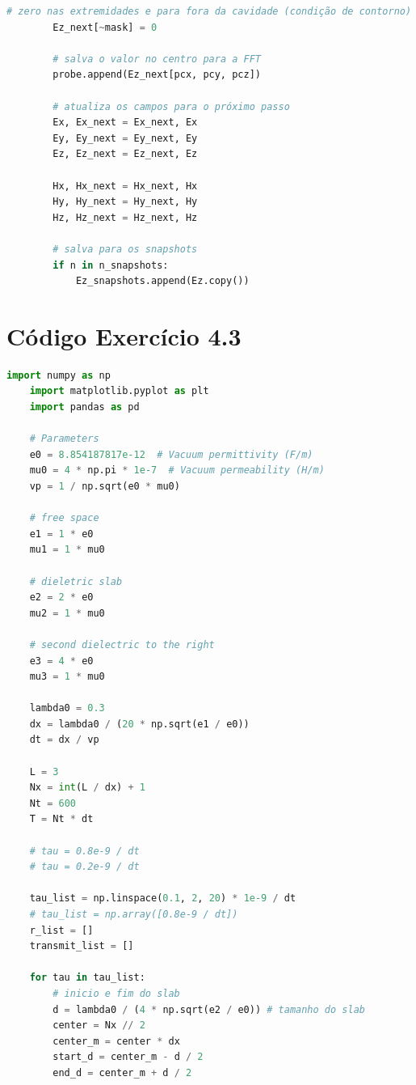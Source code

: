 \begin{anexosenv}
\begin{lstlisting}[language=Python, breaklines=true, basicstyle=\tiny]
        # zero nas extremidades e para fora da cavidade (condição de contorno)
        Ez_next[~mask] = 0

        # salva o valor no centro para a FFT
        probe.append(Ez_next[pcx, pcy, pcz])

        # atualiza os campos para o próximo passo
        Ex, Ex_next = Ex_next, Ex
        Ey, Ey_next = Ey_next, Ey
        Ez, Ez_next = Ez_next, Ez

        Hx, Hx_next = Hx_next, Hx
        Hy, Hy_next = Hy_next, Hy
        Hz, Hz_next = Hz_next, Hz

        # salva para os snapshots
        if n in n_snapshots:
            Ez_snapshots.append(Ez.copy())

    \end{lstlisting}

    \chapter{Código Exercício 4.3}\label{cap:codigo_ex4-3}

    \begin{lstlisting}[language=Python, breaklines=true, basicstyle=\tiny]
    import numpy as np
    import matplotlib.pyplot as plt
    import pandas as pd

    # Parameters
    e0 = 8.854187817e-12  # Vacuum permittivity (F/m)
    mu0 = 4 * np.pi * 1e-7  # Vacuum permeability (H/m)
    vp = 1 / np.sqrt(e0 * mu0)

    # free space
    e1 = 1 * e0
    mu1 = 1 * mu0

    # dieletric slab
    e2 = 2 * e0 
    mu2 = 1 * mu0 

    # second dielectric to the right 
    e3 = 4 * e0
    mu3 = 1 * mu0

    lambda0 = 0.3
    dx = lambda0 / (20 * np.sqrt(e1 / e0))
    dt = dx / vp

    L = 3
    Nx = int(L / dx) + 1
    Nt = 600
    T = Nt * dt

    # tau = 0.8e-9 / dt
    # tau = 0.2e-9 / dt

    tau_list = np.linspace(0.1, 2, 20) * 1e-9 / dt
    # tau_list = np.array([0.8e-9 / dt])
    r_list = []
    transmit_list = []

    for tau in tau_list:
        # inicio e fim do slab
        d = lambda0 / (4 * np.sqrt(e2 / e0)) # tamanho do slab
        center = Nx // 2
        center_m = center * dx
        start_d = center_m - d / 2
        end_d = center_m + d / 2


\end{lstlisting}
\end{anexosenv}

